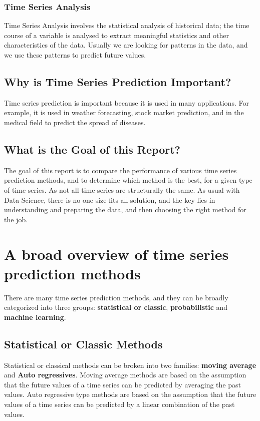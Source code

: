 \documentclass[manuscript,screen,nonacm,11pt]{acmart}
\numberwithin{equation}{section}
\begin{document}
\subsubsection{Time Series Analysis}
Time Series Analysis involves the statistical analysis of historical data; the time course of a variable is analysed to extract meaningful statistics and other characteristics of the data.
Usually we are looking for patterns in the data, and we use these patterns to predict future values.


\subsection{Why is Time Series Prediction Important?}
Time series prediction is important because it is used in many applications.
For example, it is used in weather forecasting, stock market prediction, and in the medical field to predict the spread of diseases.
\subsection{What is the Goal of this Report?}
The goal of this report is to compare the performance of various
time series prediction methods, and to determine which method is the best,
for a given type of time series. As not all time series are structurally
the same. As usual with Data Science, there is no one size fits all solution,
and the key lies in understanding and preparing the data, and then
choosing the right method for the job.


\section{A broad overview of time series prediction methods}
\label{sec:overview}
There are many time series prediction methods, and they can be broadly
categorized into three groups: \textbf{statistical or classic}, \textbf{probabilistic} and \textbf{machine learning}.
\subsection{Statistical or Classic Methods}
Statistical or classical methods can be broken into two families: \textbf{moving average} and \textbf{Auto regressives}.
Moving average methods are based on the assumption that the future values of a time series can be predicted by averaging the past values.
Auto regressive type methods are based on the assumption that the future values of a time series can be predicted by a linear combination of the past values.
\end{document}
